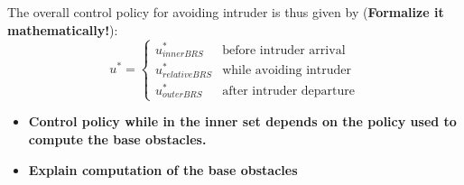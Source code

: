 %
%



%



The overall control policy for avoiding intruder is thus given by (\textbf{Formalize it mathematically!}):
\begin{equation*}
u^* = 
\left \{ 
\begin{array}{ll}
u^*_{inner BRS} & \mbox{before intruder arrival}\\
u^*_{relative BRS} & \mbox{while avoiding intruder} \\
u^*_{outer BRS} & \mbox{after intruder departure}
\end{array}
\right.
\end{equation*}

\begin{itemize}
\item \textbf{Control policy while in the inner set depends on the policy used to compute the base obstacles.}
\item \textbf{Explain computation of the base obstacles}
\end{itemize}
